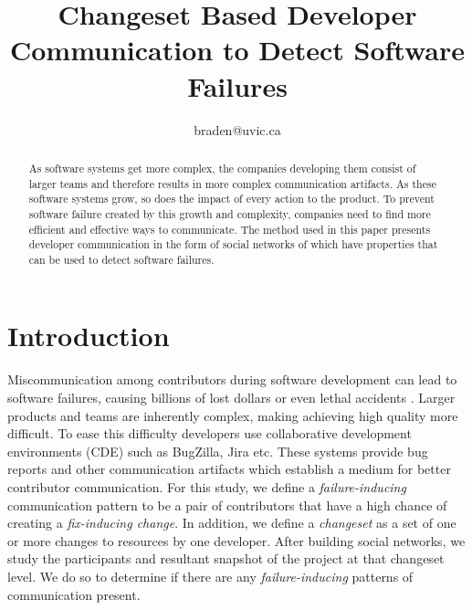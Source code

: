 \documentclass[conference]{IEEEtran}
\begin{document}
\title{Changeset Based Developer Communication to Detect Software Failures}

\author{
braden@uvic.ca}

\maketitle

\begin{abstract}
As software systems get more complex, the companies developing them consist of larger teams and therefore results in more complex communication artifacts.  As these software systems grow, so does the impact of every action to the product.  To prevent software failure created by this growth and complexity, companies need to find more efficient and effective ways to communicate.  The method used in this paper presents developer communication in the form of social networks of which have properties that can be used to detect software failures.\end{abstract}

\section{Introduction}

Miscommunication among contributors during software development can lead to software failures, causing billions of lost dollars or even lethal accidents \cite{Wolf:2009:PBF:1555001.1555017}. Larger products and teams are inherently complex, making achieving high quality more difficult. To ease this difficulty developers use collaborative development environments (CDE) such as BugZilla, Jira etc. These systems provide bug reports and other communication artifacts which establish a medium for better contributor communication. For this study, we define a \emph{failure-inducing} communication pattern to be a pair of contributors that have a high chance of creating a \emph{fix-inducing change}.  In addition, we define a \emph{changeset} as a set of one or more changes to resources by one developer.  After building social networks, we study the participants and resultant snapshot of the project at that changeset level.  We do so to determine if there are any \emph{failure-inducing} patterns of communication present.
\end{document}
